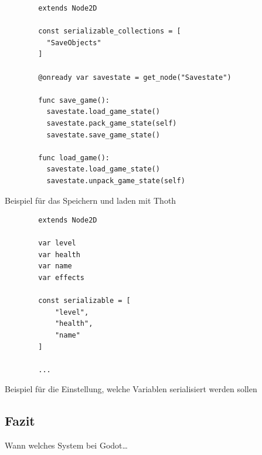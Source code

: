 \begin{listing}[htp]
    \begin{verbatim}
        extends Node2D

        const serializable_collections = [
          "SaveObjects"
        ]

        @onready var savestate = get_node("Savestate")

        func save_game():
          savestate.load_game_state()
          savestate.pack_game_state(self)  
          savestate.save_game_state()

        func load_game():
          savestate.load_game_state()
          savestate.unpack_game_state(self)
    \end{verbatim}
    \caption{Beispiel für das Speichern und laden mit Thoth}
    \label{lst:godotThoth}
\end{listing} 

\begin{listing}[htp]
    \begin{verbatim}
        extends Node2D

        var level
        var health
        var name
        var effects

        const serializable = [
            "level",
            "health",
            "name"
        ]

        ...
    \end{verbatim}
    \caption{Beispiel für die Einstellung, welche Variablen serialisiert werden sollen}
    \label{lst:godotThothObject}
\end{listing} 

\subsection{Fazit}
Wann welches System bei Godot\dots